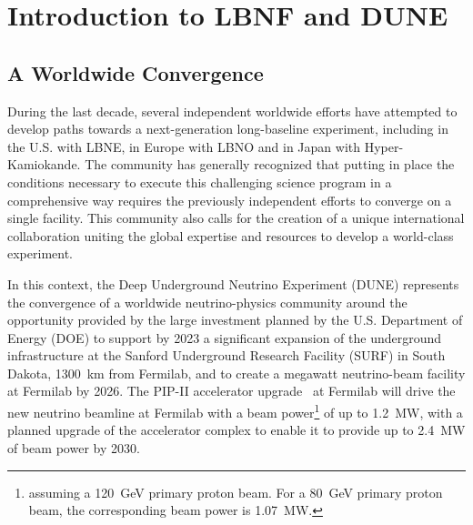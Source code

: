 

\chapter{Introduction to LBNF and DUNE}
\label{ch:project-overview}

%
%
\section{A Worldwide Convergence}

During the last decade, several independent worldwide efforts have attempted to develop paths towards a next-generation long-baseline experiment, including in the U.S. with LBNE, in Europe with LBNO and in Japan with Hyper-Kamiokande. The community has %
generally recognized that putting in place %
the conditions necessary to 
execute this challenging science program in a comprehensive way requires the previously independent 
efforts to converge on a single facility. This community %
also calls for the creation of a unique international collaboration uniting %
the global expertise and resources to develop a world-class experiment.

In this context, the Deep Underground Neutrino Experiment (DUNE) represents the convergence of a worldwide neutrino-physics community around the opportunity provided by the 
large investment planned by the U.S. Department of Energy (DOE) to support by 2023 a significant expansion of the underground infrastructure at the Sanford Underground Research 
Facility (SURF) in South Dakota, \SI{1300}{\km} from Fermilab, and to create a megawatt neutrino-beam facility at Fermilab by 2026.  The PIP-II accelerator upgrade~\cite{pip2-2013} at 
Fermilab will drive the new neutrino beamline at Fermilab with a beam power\footnote{assuming a \SI{120}{\GeV} primary proton beam. For a \SI{80}{\GeV} primary proton beam, the corresponding beam power is \SI{1.07}{\MW}.} of up to \SI{1.2}{\MW}, with a planned upgrade 
of the accelerator complex to enable it to provide up to \SI{2.4}{\MW} of beam power by 2030.  


